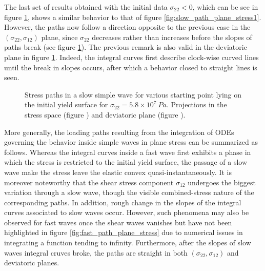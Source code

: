 The last set of results obtained with the initial data $\sigma_{22}<0$, which can be see in figure \ref{fig:slow_path_plane_stress3}, shows a similar behavior to that of figure \ref{fig:slow_path_plane_stress1}.
However, the paths now follow a direction opposite to the previous case in the $(\sigma_{22},\sigma_{12})$ plane, since $\sigma_{22}$ decreases rather than increases before the slopes of paths break (see figure \ref{fig:slow_path_plane_stress3}).
The previous remark is also valid in the deviatoric plane in figure \ref{fig:slow_path_plane_stress3}.
Indeed, the integral curves first describe clock-wise curved lines until the break in slopes occurs, after which a behavior closed to straight lines is seen.
\begin{figure}[h!]
  \centering
  \caption{Stress paths in a slow simple wave for various starting point lying on the initial yield surface for $\sigma_{22}=5.8\times 10^7 \: Pa$. Projections in the stress space (figure ) and deviatoric plane (figure ).}
  \label{fig:slow_path_plane_stress3}
\end{figure}

More generally, the loading paths resulting from the integration of ODEs governing the behavior inside simple waves in plane stress can be summarized as follows.
Whereas the integral curves inside a fast wave first exhibits a phase in which the stress is restricted to the initial yield surface, the passage of a slow wave make the stress leave the elastic convex quasi-instantaneously.
It is moreover noteworthy that the shear stress component $\sigma_{12}$ undergoes the biggest variation through a slow wave, though the visible combined-stress nature of the corresponding paths.
In addition, rough change in the slopes of the integral curves associated to slow waves occur.
However, such phenomena may also be observed for fast waves once the shear waves vanishes but have not been highlighted in figure \ref{fig:fast_path_plane_stress} due to numerical issues in integrating a function tending to infinity.
Furthermore, after the slopes of slow waves integral cruves broke, the paths are straight in both $(\sigma_{22},\sigma_{12})$ and deviatoric planes.

